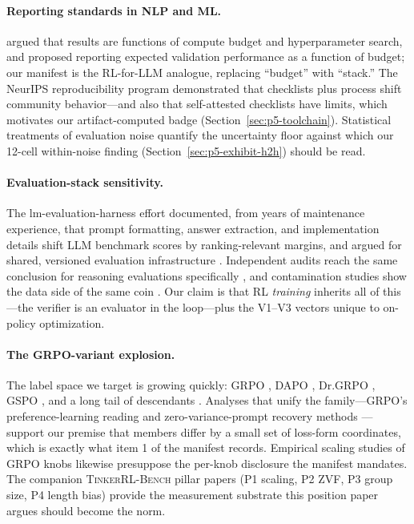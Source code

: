 \documentclass{article}  \usepackage[preprint,nonatbib]{neurips_2026} \usepackage[numbers]{natbib}
\newcommand{\ours}{\textsc{TinkerRL-Bench}}
\providecommand{\secref}[1]{Section~\ref{#1}}
\begin{document}
\paragraph{Reporting standards in NLP and ML.} \citet{dodge2019show} argued
that results are functions of compute budget and hyperparameter search, and
proposed reporting expected validation performance as a function of budget;
our manifest is the RL-for-LLM analogue, replacing ``budget'' with ``stack.''
The NeurIPS reproducibility program \citep{pineau2020improving} demonstrated
that checklists plus process shift community behavior---and also that
self-attested checklists have limits, which motivates our artifact-computed
badge (\secref{sec:p5-toolchain}). Statistical treatments of evaluation
noise \citep{miller2024erroreval, zhang2024benchvariance} quantify the
uncertainty floor against which our 12-cell within-noise finding
(\secref{sec:p5-exhibit-h2h}) should be read.

\paragraph{Evaluation-stack sensitivity.} The lm-evaluation-harness effort
documented, from years of maintenance experience, that prompt formatting,
answer extraction, and implementation details shift LLM benchmark scores by
ranking-relevant margins, and argued for shared, versioned evaluation
infrastructure \citep{biderman2024lessons}. Independent audits reach the same
conclusion for reasoning evaluations specifically
\citep{hochlehnert2025sober}, and contamination studies show the data side of
the same coin \citep{zhang2024gsm1k, riddell2024contamination}. Our claim is
that RL \emph{training} inherits all of this---the verifier is an evaluator
in the loop---plus the V1--V3 vectors unique to on-policy optimization.

\paragraph{The GRPO-variant explosion.} The label space we target is growing
quickly: GRPO \citep{shao2024deepseekmath, guo2025deepseekr1}, DAPO
\citep{yu2025dapo}, Dr.GRPO \citep{tong2025drgrpo}, GSPO \citep{qwen2025gspo},
and a long tail of descendants \citep{liu2026gdpo, nan2025ngrpo,
zhang2025scaffgrpo, lu2025grpolead, bytedance2025vapo}. Analyses that unify
the family---GRPO's preference-learning reading \citep{rafailov2024direct,
wu2025grpo_dpo} and zero-variance-prompt recovery methods \citep{le2025rlzvp}
---support our premise that members differ by a small set of loss-form
coordinates, which is exactly what item 1 of the manifest records. Empirical
scaling studies of GRPO knobs \citep{tan2025scalingrl} likewise presuppose
the per-knob disclosure the manifest mandates. The companion \ours{} pillar
papers (P1 scaling, P2 ZVF, P3 group size, P4 length bias) provide the
measurement substrate this position paper argues should become the norm.
\end{document}
